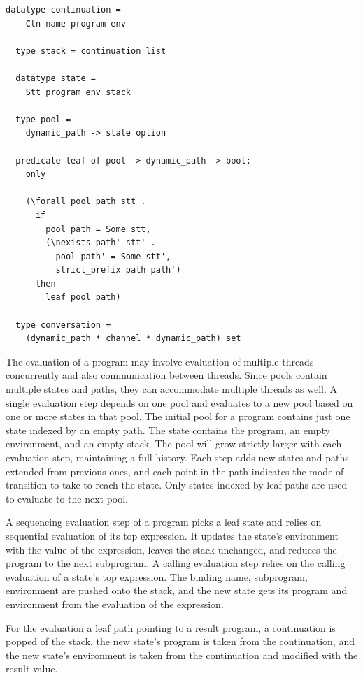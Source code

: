 \documentclass{article}
\begin{document}
\begin{lstlisting}[language=logic, mathescape]
  datatype continuation =
    Ctn name program env

  type stack = continuation list

  datatype state =
    Stt program env stack 

  type pool =
    dynamic_path -> state option

  predicate leaf of pool -> dynamic_path -> bool:
    only

    (\forall pool path stt .
      if
        pool path = Some stt,
        (\nexists path' stt' .
          pool path' = Some stt',
          strict_prefix path path')
      then
        leaf pool path)

  type conversation =
    (dynamic_path * channel * dynamic_path) set
  \end{lstlisting}

The evaluation of a program may involve evaluation of multiple threads concurrently and also
communication between threads. Since pools contain multiple states and paths, they can
accommodate multiple threads as well.  A single evaluation step depends on one pool and
evaluates to a new pool based on one or more states in that pool. The initial pool for a
program contains just one state indexed by an empty path. The state contains the program, an
empty environment, and an empty stack. The pool will grow strictly larger with each evaluation
step, maintaining a full history. Each step adds new states and paths extended from previous
ones, and each point in the path indicates the mode of transition to take to reach the state.
Only states indexed by leaf paths are used to evaluate to the next pool.

A sequencing evaluation step of a program picks a leaf state and relies on
sequential evaluation of its top expression. It updates the state's environment with the
value of the expression, leaves the stack unchanged, and reduces the program to the next
subprogram. A calling evaluation step relies on the calling evaluation of a state's top
expression. The binding name, subprogram, environment are pushed onto the stack, and the new
state gets its program and environment from the evaluation of the expression. 

For the evaluation a leaf path pointing to a result program, a continuation is popped of the
stack, the new state's program is taken from the continuation, and the new state's environment
is taken from the continuation and modified with the result value.
\end{document}
